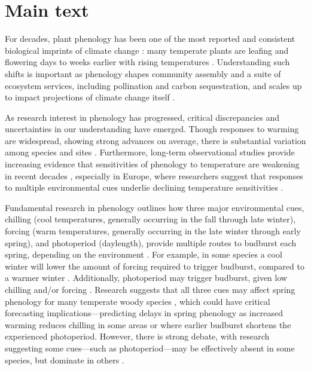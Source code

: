 \documentclass{article}
\begin{document}
\section* {Main text}
\par For decades, plant phenology has been one of the most reported and consistent biological imprints of climate change \emph{\citep{IPCC:2014sm}}: many temperate plants are leafing and flowering days to weeks earlier with rising temperatures \emph{\citep{millerrushing2008,menzel2006}}. Understanding such shifts is important as phenology shapes community assembly and a suite of ecosystem services, including pollination and carbon sequestration, and scales up to impact projections of climate change itself \emph{\citep{Cleland:2007or}}.
\par As research interest in phenology has progressed, critical discrepancies and uncertainties in our understanding have emerged. Though responses to warming are widespread, showing strong advances on average, there is substantial variation among species and sites \emph{\citep{Wolkovich:2012n}}. Furthermore, long-term observational studies provide increasing evidence that sensitivities of phenology to temperature are weakening in recent decades \emph{\citep{Rutishauser:2008,yu2010,wang2019}}, especially in Europe, where researchers suggest that responses to multiple environmental cues underlie declining temperature sensitivities \emph{\citep{fu2015}}. 
\par Fundamental research in phenology outlines how three major environmental cues, chilling (cool temperatures, generally occurring in the fall through late winter), forcing (warm temperatures, generally occurring in the late winter through early spring), and photoperiod (daylength), provide multiple routes to budburst each spring, depending on the environment \emph{\citep{chuine2016}}. For example, in some species a cool winter will lower the amount of forcing required to trigger budburst, compared to a warmer winter \emph{\citep{harrington2015}}. Additionally, photoperiod may trigger budburst, given low chilling and/or forcing \emph{\citep{zohner2016,Basler:2014aa, Caffarra:2011b}}. Research suggests that all three cues may affect spring phenology for many temperate woody species \emph{\citep{Basler:2014aa,flynn2018,Caffarra:2011qf}}, which could have critical forecasting implications---predicting delays in spring phenology as increased warming reduces chilling in some areas \emph{\citep{fraga2019}} or where earlier budburst shortens the experienced photoperiod. However, there is strong debate, with research suggesting some cues---such as photoperiod---may be effectively absent in some species, but dominate in others \emph{\citep{zohner2016,Basler:2014aa,Heide:1993,Singh:2017}}. 
\end{document}
